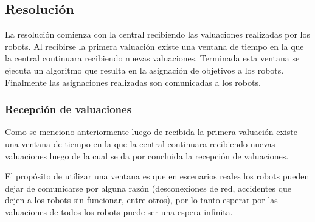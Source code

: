 


\subsection{Resolución} \label{subsec:MiResSub}
La resolución comienza con la central recibiendo las valuaciones realizadas por
los robots. Al recibirse la primera valuación existe una ventana de tiempo en
la que la central continuara recibiendo nuevas valuaciones. Terminada esta
ventana se ejecuta un algoritmo que resulta en la asignación de objetivos a los
robots. Finalmente las asignaciones realizadas son comunicadas a los robots.

\subsubsection{Recepción de valuaciones}
Como se menciono anteriormente luego de recibida la primera valuación existe
una ventana de tiempo en la que la central continuara recibiendo nuevas
valuaciones luego de la cual se da por concluida la recepción de valuaciones. 

El propósito de utilizar una ventana es que en escenarios reales los robots
pueden dejar de comunicarse por alguna razón (desconexiones de red, accidentes
que dejen a los robots sin funcionar, entre otros), por lo tanto esperar por
las valuaciones de todos los robots puede ser una espera infinita.

